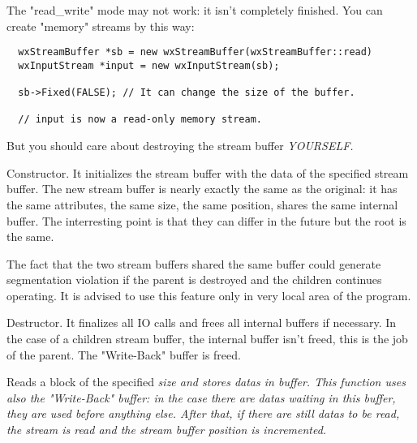 The "read\_write" mode may not work: it isn't completely finished.
You can create "memory" streams by this way:
\begin{verbatim}
  wxStreamBuffer *sb = new wxStreamBuffer(wxStreamBuffer::read)
  wxInputStream *input = new wxInputStream(sb);

  sb->Fixed(FALSE); // It can change the size of the buffer.

  // input is now a read-only memory stream.
\end{verbatim}
But you should care about destroying the stream buffer \it{YOURSELF}.




Constructor. It initializes the stream buffer with the data of the specified
stream buffer. The new stream buffer is nearly exactly the same as the
original: it has the same attributes, the same size, the same position, shares
the same internal buffer. The interresting point is that they can differ
in the future but the root is the same.


The fact that the two stream buffers shared the same buffer could generate
segmentation violation if the parent is destroyed and the children continues
operating. It is advised to use this feature only in very local area of the
program.



Destructor. It finalizes all IO calls and frees all internal buffers if
necessary. In the case of a children stream buffer, the internal buffer isn't
freed, this is the job of the parent.
The "Write-Back" buffer is freed.

\label{wxstreambufread}


Reads a block of the specified \it{size} and stores datas in \it{buffer}.
This function uses also the "Write-Back" buffer: in the case there are datas
waiting in this buffer, they are used before anything else. After that, if there
are still datas to be read, the stream is read and the stream buffer position
is incremented.

